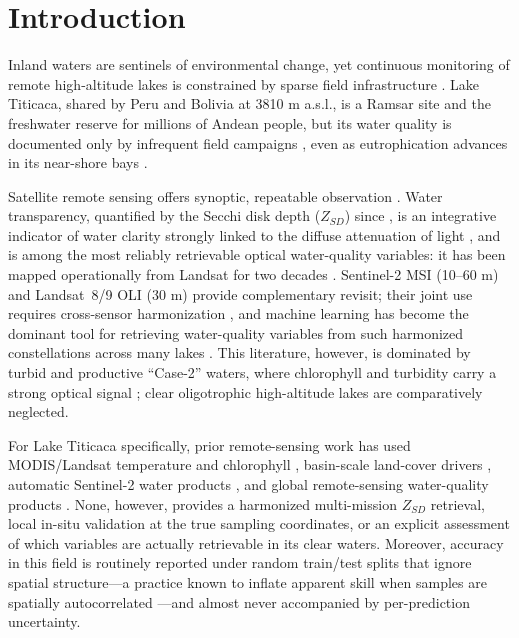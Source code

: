 \documentclass[pdflatex,sn-basic]{sn-jnl}
\begin{document}
\section{Introduction}\label{sec:intro}
Inland waters are sentinels of environmental change, yet continuous monitoring of
remote high-altitude lakes is constrained by sparse field infrastructure
\citep{Williamson2009}. Lake Titicaca, shared by Peru and Bolivia at 3810 m a.s.l.,
is a Ramsar site and the freshwater reserve for millions of Andean people, but its
water quality is documented only by infrequent field campaigns
\citep{OEFA2016,Siguayro2022eval}, even as eutrophication advances in its
near-shore bays \citep{Heredia2022,Lanza2024}.

Satellite remote sensing offers synoptic, repeatable observation
\citep{Gholizadeh2016,Topp2020}. Water transparency, quantified by the Secchi disk
depth ($Z_{SD}$) since \citet{Tyler1968}, is an integrative indicator of water
clarity strongly linked to the diffuse attenuation of light \citep{Lee2015}, and is
among the most reliably retrievable optical water-quality variables: it has been
mapped operationally from Landsat for two decades
\citep{Kloiber2002,Olmanson2008,Zhang2022}. Sentinel-2 MSI (10--60 m) and
Landsat~8/9 OLI (30 m) provide complementary revisit; their joint use requires
cross-sensor harmonization \citep{Roy2016,Claverie2018,Pahlevan2019}, and machine
learning has become the dominant tool for retrieving water-quality variables from
such harmonized constellations across many lakes
\citep{Pahlevan2020,Cao2020,Cao2022,Arias2023,Pahlevan2022,Hafeez2019,Tian2023}.
This literature, however, is dominated by turbid and productive ``Case-2'' waters,
where chlorophyll and turbidity carry a strong optical signal
\citep{Gitelson2009,Mishra2012,Nechad2010,Dogliotti2015}; clear oligotrophic
high-altitude lakes are comparatively neglected.

For Lake Titicaca specifically, prior remote-sensing work has used MODIS/Landsat
temperature and chlorophyll \citep{RuizVerdu2016}, basin-scale land-cover drivers
\citep{Baltodano2022}, automatic Sentinel-2 water products \citep{AyalaIzurieta2023},
and global remote-sensing water-quality products \citep{Maligaya2024}. None,
however, provides a harmonized multi-mission $Z_{SD}$ retrieval, local in-situ
validation at the true sampling coordinates, or an explicit assessment of which
variables are actually retrievable in its clear waters. Moreover, accuracy in this field is routinely
reported under random train/test splits that ignore spatial structure---a practice
known to inflate apparent skill when samples are spatially autocorrelated
\citep{Roberts2017,Ploton2020}---and almost never accompanied by per-prediction
uncertainty.
\end{document}
